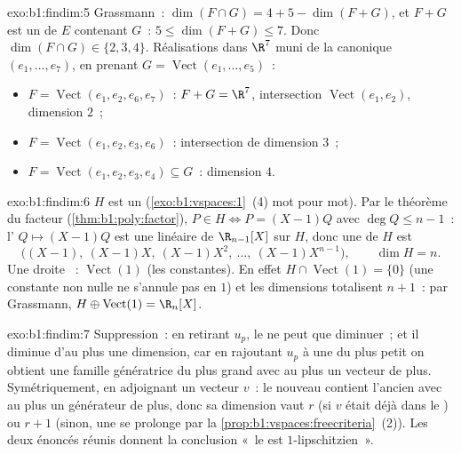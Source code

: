 \begin{solution}{exo:b1:findim:5}
Grassmann~: $\dim(F \cap G) = 4 + 5 - \dim(F + G)$, et $F + G$ est un
 de $E$ contenant $G$~: $5 \leq \dim(F+G) \leq 7$. Donc
$\dim(F \cap G) \in \{2, 3, 4\}$. Réalisations dans $\R^7$ muni de la
 canonique $(e_1, \dots, e_7)$, en prenant $G =
\operatorname{Vect}(e_1, \dots, e_5)$~:
\begin{itemize}
  \item $F = \operatorname{Vect}(e_1, e_2, e_6, e_7)$~: $F + G = \R^7$,
        intersection $\operatorname{Vect}(e_1, e_2)$, dimension $2$~;
  \item $F = \operatorname{Vect}(e_1, e_2, e_3, e_6)$~: intersection
        de dimension $3$~;
  \item $F = \operatorname{Vect}(e_1, e_2, e_3, e_4) \subseteq G$~:
        dimension $4$.
\end{itemize}
\end{solution}

\begin{solution}{exo:b1:findim:6}
$H$ est un  (\cref{exo:b1:vspaces:1}~(4) mot pour mot). Par
le théorème du facteur (\cref{thm:b1:poly:factor}), $P \in H \iff P =
(X-1)Q$ avec $\deg Q \leq n - 1$~: l' $Q \mapsto (X-1)Q$ est
une  linéaire de $\R_{n-1}[X]$ sur $H$, donc une  de $H$
est
\[
\bigl((X-1),\ (X-1)X,\ (X-1)X^2,\ \dots,\ (X-1)X^{n-1}\bigr),
\qquad \dim H = n .
\]
Une droite ~: $\operatorname{Vect}(1)$ (les constantes).
En effet $H \cap \operatorname{Vect}(1) = \{0\}$ (une constante non
nulle ne s'annule pas en $1$) et les dimensions totalisent $n + 1$~:
par Grassmann, $H \oplus \operatorname{Vect}(1) = \R_n[X]$.
\end{solution}

\begin{solution}{exo:b1:findim:7}
Suppression~: en retirant $u_p$, le  ne peut que
diminuer~; et il diminue d'au plus une dimension, car en rajoutant
$u_p$ à une  du plus petit  on obtient une famille
génératrice du plus grand avec au plus un vecteur de plus.
Symétriquement, en adjoignant un vecteur $v$~: le nouveau  contient l'ancien avec au plus un générateur de plus, donc sa
dimension vaut $r$ (si $v$ était déjà dans le ) ou
$r + 1$ (sinon, une  se prolonge par
la \cref{prop:b1:vspaces:freecriteria}~(2)). Les deux énoncés réunis
donnent la conclusion «~le  est $1$-lipschitzien~».
\end{solution}


